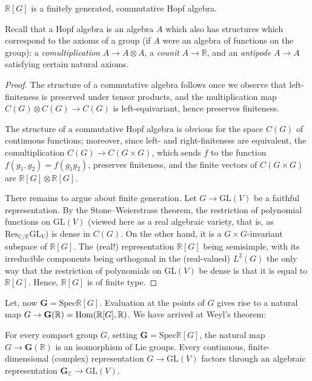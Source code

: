 \begin{proposition}
\label{proposition-Hopfalgebra}
 $\mathbb R[G]$ is a finitely generated, commutative Hopf algebra.
\end{proposition}

Recall that a Hopf algebra is an algebra $A$ which also has structures which correspond to the axioms of a group (if $A$ were an algebra of functions on the group): a \emph{comultiplication} $A\to A\otimes A$, a \emph{counit} $A\to \mathbb R$, and an \emph{antipode} $A\to A$ satisfying certain natural axioms. 

\begin{proof}
The structure of a commutative algebra follows once we observe that left-finiteness is preserved under tensor products, and the multiplication map $C(G)\otimes C(G) \to C(G)$ is left-equivariant, hence preserves finiteness. 

The structure of a commutative Hopf algebra is obvious for the space $C(G)$ of continuous functions; moreover, since left- and right-finiteness are equivalent, the comultiplication $C(G)\to C(G \times G)$, which sends $f$ to the function $f(g_1,g_2)=f(g_1g_2)$, preserves finiteness, and the finite vectors of $C(G\times G)$ are $\mathbb R[G]\otimes \mathbb R[G]$.

There remains to argue about finite generation. Let $G\to \text{GL}(V)$ be a faithful representation. By the Stone--Weierstrass theorem, the restriction of polynomial functions on $\text{GL}(V)$ (viewed here as a real algebraic variety, that is, as $\text{Res}_{\mathbb C/\mathbb R} \text{GL}_V$) is dense in $C(G)$. On the other hand, it is a $G\times G$-invariant subspace of $\mathbb R[G]$. The (real!) representation $\mathbb R[G]$ being semisimple, with its irreducible components being orthogonal in the (real-valued) $L^2(G)$ the only way that the restriction of polynomials on $\text{GL}(V)$ be dense is that it is equal to $\mathbb R[G]$. Hence, $\mathbb R[G]$ is of finite type.
\end{proof}

Let, now $\mathbf G=\text{Spec} \mathbb R[G]$. Evaluation at the points of $G$ gives rise to a natural map $G\to \mathbf G(\mathbb R) = \mathop{\rm Hom}\nolimits (\mathbb R[G], \mathbb R)$. 
We have arrived at Weyl's theorem:

\begin{theorem}
\label{theorem-Weyl}
 For every compact group $G$, setting $\mathbf G=\text{Spec} \mathbb R[G]$, the natural map  $G\to \mathbf G(\mathbb R)$ is an isomorphism of Lie groups. Every continuous, finite-dimensional (complex) representation $G\to \text{GL}(V)$ factors through an algebraic representation $\mathbf G_{\mathbb C} \to \text{GL}(V)$.
\end{theorem}

